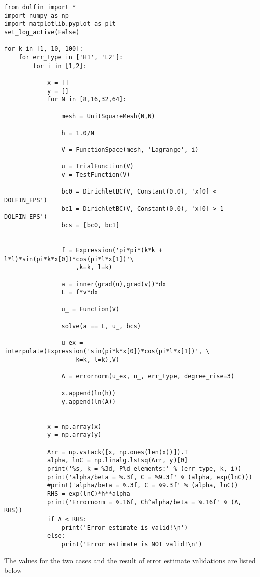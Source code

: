 \documentclass[a4paper,english,12pt,twoside]{article}
\begin{document}
\begin{lstlisting}[style=python, basicstyle = \tiny]
from dolfin import *
import numpy as np
import matplotlib.pyplot as plt
set_log_active(False)

for k in [1, 10, 100]:
	for err_type in ['H1', 'L2']:
		for i in [1,2]:
		
			x = []
			y = []
			for N in [8,16,32,64]:

				mesh = UnitSquareMesh(N,N)

				h = 1.0/N

				V = FunctionSpace(mesh, 'Lagrange', i)

				u = TrialFunction(V)
				v = TestFunction(V)

				bc0 = DirichletBC(V, Constant(0.0), 'x[0] < DOLFIN_EPS')
				bc1 = DirichletBC(V, Constant(0.0), 'x[0] > 1-DOLFIN_EPS')
				bcs = [bc0, bc1]


				f = Expression('pi*pi*(k*k + l*l)*sin(pi*k*x[0])*cos(pi*l*x[1])'\
					,k=k, l=k)

				a = inner(grad(u),grad(v))*dx
				L = f*v*dx

				u_ = Function(V)

				solve(a == L, u_, bcs)

				u_ex = interpolate(Expression('sin(pi*k*x[0])*cos(pi*l*x[1])', \
					k=k, l=k),V)

				A = errornorm(u_ex, u_, err_type, degree_rise=3)

				x.append(ln(h))
				y.append(ln(A))


			x = np.array(x)
			y = np.array(y)

			Arr = np.vstack([x, np.ones(len(x))]).T
			alpha, lnC = np.linalg.lstsq(Arr, y)[0]
			print('%s, k = %3d, P%d elements:' % (err_type, k, i))
			print('alpha/beta = %.3f, C = %9.3f' % (alpha, exp(lnC)))
			#print('alpha/beta = %.3f, C = %9.3f' % (alpha, lnC))
			RHS = exp(lnC)*h**alpha
			print('Errornorm = %.16f, Ch^alpha/beta = %.16f' % (A, RHS))
			if A < RHS:
				print('Error estimate is valid!\n')
			else:
				print('Error estimate is NOT valid!\n')
\end{lstlisting}

\newpage

The values for the two cases and the result of error estimate validations are listed below
\end{document}

